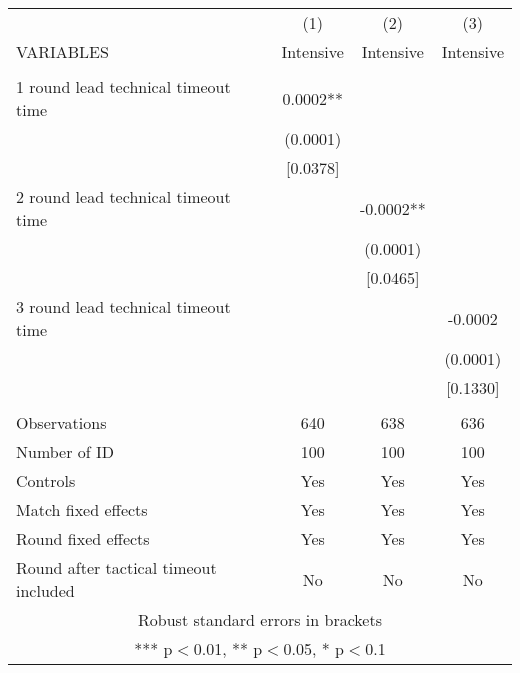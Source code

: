 \documentclass[]{article}
\begin{document}
\begin{tabular}{lccc} \hline
 & (1) & (2) & (3) \\
VARIABLES & Intensive & Intensive & Intensive \\ \hline
 &  &  &  \\
1 round lead technical timeout time & 0.0002** &  &  \\
 & (0.0001) &  &  \\
 & [0.0378] &  &  \\
2 round lead technical timeout time &  & -0.0002** &  \\
 &  & (0.0001) &  \\
 &  & [0.0465] &  \\
3 round lead technical timeout time &  &  & -0.0002 \\
 &  &  & (0.0001) \\
 &  &  & [0.1330] \\
 &  &  &  \\
Observations & 640 & 638 & 636 \\
Number of ID & 100 & 100 & 100 \\
Controls & Yes & Yes & Yes \\
Match fixed effects & Yes & Yes & Yes \\
Round fixed effects & Yes & Yes & Yes \\
 Round after tactical timeout included & No & No & No \\ \hline
\multicolumn{4}{c}{ Robust standard errors in brackets} \\
\multicolumn{4}{c}{ *** p$<$0.01, ** p$<$0.05, * p$<$0.1} \\
\end{tabular}
\end{document}
